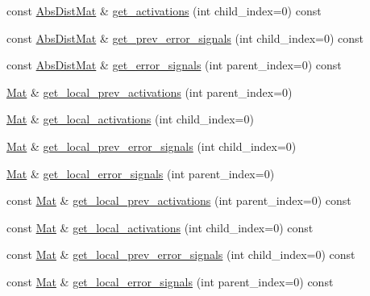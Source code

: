 \begin{DoxyCompactItemize}
\item 
const \hyperlink{base_8hpp_a9a697a504ae84010e7439ffec862b470}{Abs\+Dist\+Mat} \& \hyperlink{classlbann_1_1Layer_af69a4773804c6982e8acaf5810eaa150}{get\+\_\+activations} (int child\+\_\+index=0) const
\item 
const \hyperlink{base_8hpp_a9a697a504ae84010e7439ffec862b470}{Abs\+Dist\+Mat} \& \hyperlink{classlbann_1_1Layer_aff2c8983548364c978acb09ddf58a6fc}{get\+\_\+prev\+\_\+error\+\_\+signals} (int child\+\_\+index=0) const
\item 
const \hyperlink{base_8hpp_a9a697a504ae84010e7439ffec862b470}{Abs\+Dist\+Mat} \& \hyperlink{classlbann_1_1Layer_ae09bc5a240e9042371203ba5ff19990c}{get\+\_\+error\+\_\+signals} (int parent\+\_\+index=0) const
\item 
\hyperlink{base_8hpp_a68f11fdc31b62516cb310831bbe54d73}{Mat} \& \hyperlink{classlbann_1_1Layer_a35397843bb0c84030000c7d872229acb}{get\+\_\+local\+\_\+prev\+\_\+activations} (int parent\+\_\+index=0)
\item 
\hyperlink{base_8hpp_a68f11fdc31b62516cb310831bbe54d73}{Mat} \& \hyperlink{classlbann_1_1Layer_a4248f27acebf72b7b7b3ee39c8bcb62a}{get\+\_\+local\+\_\+activations} (int child\+\_\+index=0)
\item 
\hyperlink{base_8hpp_a68f11fdc31b62516cb310831bbe54d73}{Mat} \& \hyperlink{classlbann_1_1Layer_a82827edc5e869960144f3ccb2172bfcd}{get\+\_\+local\+\_\+prev\+\_\+error\+\_\+signals} (int child\+\_\+index=0)
\item 
\hyperlink{base_8hpp_a68f11fdc31b62516cb310831bbe54d73}{Mat} \& \hyperlink{classlbann_1_1Layer_af178d00b9d878aa7d87754bff2a91f3a}{get\+\_\+local\+\_\+error\+\_\+signals} (int parent\+\_\+index=0)
\item 
const \hyperlink{base_8hpp_a68f11fdc31b62516cb310831bbe54d73}{Mat} \& \hyperlink{classlbann_1_1Layer_ab0f7b4d0fdb06004dfde5358781eeece}{get\+\_\+local\+\_\+prev\+\_\+activations} (int parent\+\_\+index=0) const
\item 
const \hyperlink{base_8hpp_a68f11fdc31b62516cb310831bbe54d73}{Mat} \& \hyperlink{classlbann_1_1Layer_aadbc466c72f455c10b53bf45dca56332}{get\+\_\+local\+\_\+activations} (int child\+\_\+index=0) const
\item 
const \hyperlink{base_8hpp_a68f11fdc31b62516cb310831bbe54d73}{Mat} \& \hyperlink{classlbann_1_1Layer_af3490fe9011ef620b827970bc5dcc7a7}{get\+\_\+local\+\_\+prev\+\_\+error\+\_\+signals} (int child\+\_\+index=0) const
\item 
const \hyperlink{base_8hpp_a68f11fdc31b62516cb310831bbe54d73}{Mat} \& \hyperlink{classlbann_1_1Layer_acf76bc7fba1e8ab74947ef83a3c8a141}{get\+\_\+local\+\_\+error\+\_\+signals} (int parent\+\_\+index=0) const

\end{DoxyCompactItemize}
